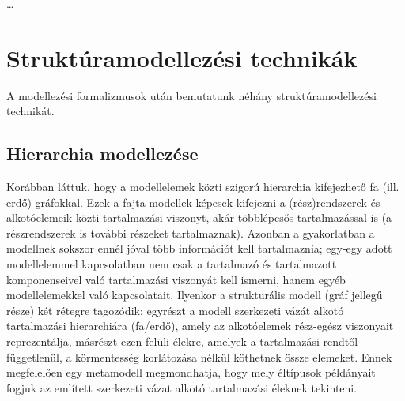 \ldots


\section{Struktúramodellezési technikák}

%
%
%	

A modellezési formalizmusok után bemutatunk néhány struktúramodellezési technikát.

\subsection{Hierarchia modellezése}

Korábban láttuk, hogy a modellelemek közti szigorú hierarchia kifejezhető fa (ill. erdő) gráfokkal. Ezek a fajta modellek képesek kifejezni a (rész)rendszerek és alkotóelemeik közti tartalmazási viszonyt, akár többlépcsős tartalmazással is (a részrendszerek is további részeket tartalmaznak). Azonban a gyakorlatban a modellnek sokszor ennél jóval több információt kell tartalmaznia; egy-egy adott modellelemmel kapcsolatban nem csak a tartalmazó és tartalmazott komponenseivel való tartalmazási viszonyát kell ismerni, hanem egyéb modellelemekkel való kapcsolatait. Ilyenkor a strukturális modell (gráf jellegű része) két rétegre tagozódik: egyrészt a modell szerkezeti vázát alkotó tartalmazási hierarchiára (fa/erdő), amely az alkotóelemek rész-egész viszonyait reprezentálja, másrészt ezen felüli  élekre, amelyek a tartalmazási rendtől függetlenül, a körmentesség korlátozása nélkül köthetnek össze elemeket. Ennek megfelelően egy metamodell megmondhatja, hogy mely éltípusok példányait fogjuk az említett szerkezeti vázat alkotó tartalmazási éleknek tekinteni. 

